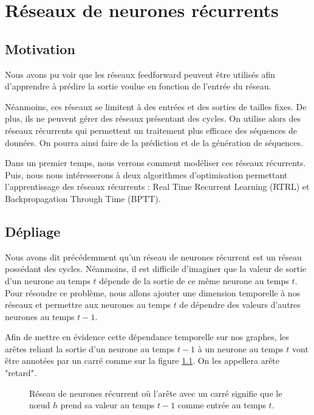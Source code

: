 \chapter{Réseaux de neurones récurrents}
\label{chap:Réseaux de neurones récurrents}
\section{Motivation}

Nous avons pu voir que les réseaux feedforward peuvent être utilisés afin d'apprendre à prédire la sortie voulue en fonction de l'entrée du réseau. 

Néanmoins, ces réseaux se limitent à des entrées et des sorties de tailles fixes. De plus, ils ne peuvent gérer des réseaux présentant des cycles. On utilise alors des réseaux récurrents qui permettent un traitement plus efficace des séquences de données. On pourra ainsi faire de la prédiction et de la génération de séquences.

Dans un premier temps, nous verrons comment modéliser ces réseaux récurrents. Puis, nous nous intéresserons à deux algorithmes d'optimisation permettant l'apprentissage des réseaux récurrents : Real Time Recurrent Learning (RTRL) et Backpropagation Through Time (BPTT).

\section{Dépliage}

Nous avons dit précédemment qu'un réseau de neurones récurrent est un réseau possédant des cycles. Néanmoins, il est difficile d'imaginer que la valeur de sortie d'un neurone au temps $t$ dépende de la sortie de ce même neurone au temps $t$. Pour résoudre ce problème, nous allons ajouter une dimension temporelle à nos réseaux et permettre aux neurones au temps $t$ de dépendre des valeurs d'autres neurones au temps $t-1$.

Afin de mettre en évidence cette dépendance temporelle sur nos graphes, les arêtes reliant la sortie d'un neurone au temps $t-1$ à un neurone au temps $t$ vont être annotées par un carré comme sur la figure \ref{arete_retard}. On les appellera arête "retard".

\begin{figure}
\begin{center}

\caption{Réseau de neurones récurrent où l'arête avec un carré signifie que le n\oe{}ud $h$ prend sa valeur au temps $t-1$ comme entrée au temps $t$.}
\label{arete_retard}
\end{center}
\end{figure}

